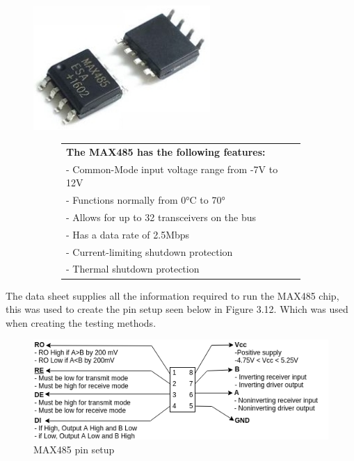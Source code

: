 \begin{figure}[H]
  \centering
  \begin{minipage}[b]{0.38\textwidth}
    \centering
      \includegraphics[width=0.6\textwidth]{max485.jpg}
    \caption{MAX485 chip \cite{max485} }
  \end{minipage}
  \hfill
  \begin{minipage}[b]{0.59\textwidth}
    \begin{table}[H]
    \centering
    \begin{figure}[H]
        \centering
        \begin{tabular}{|l|}
        \hline
        \textbf{The MAX485 has the following features:}\\
        - Common-Mode input voltage range from -7V to 12V\\
        - Functions normally from 0°C to 70°\\
        - Allows for up to 32 transceivers on the bus\\
        - Has a data rate of 2.5Mbps\\
        - Current-limiting shutdown protection\\
        - Thermal shutdown protection\\
        \hline
        \end{tabular}
    \end{figure}
    \end{table}
  \end{minipage}
\end{figure}

The data sheet supplies all the information required to run the MAX485 chip, this was used to create the pin setup seen below in Figure 3.12. Which was used when creating the testing methods.
\vspace{15mm}

\begin{figure}[H]
\centering
\includegraphics[width=1\textwidth]{MAX485_setup.png}
\caption{MAX485 pin setup}
\label{fig:model}
\end{figure}

